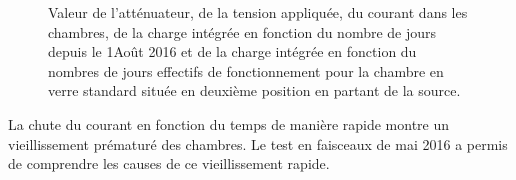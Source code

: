 \begin{figure}[!ht]
	\caption{Valeur de l'atténuateur, de la tension appliquée, du courant dans les chambres, de la charge intégrée en fonction du nombre de jours depuis le 1\ier Août 2016  et de la charge intégrée en fonction du nombres de jours effectifs de fonctionnement pour la chambre en verre standard située en deuxième position en partant de la source.}
	\label{CourantHR}
\end{figure}

La chute du courant en fonction du temps de manière rapide montre un vieillissement prématuré des chambres. Le test en faisceaux de mai 2016 a permis de comprendre les causes de ce vieillissement rapide.

